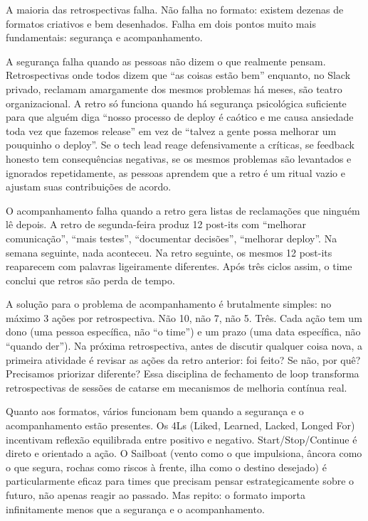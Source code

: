 A maioria das retrospectivas falha. Não falha no formato: existem dezenas
de formatos criativos e bem desenhados. Falha em dois pontos muito mais
fundamentais: segurança e acompanhamento.

A segurança falha quando as pessoas não dizem o que realmente pensam.
Retrospectivas onde todos dizem que ``as coisas estão bem'' enquanto, no
Slack privado, reclamam amargamente dos mesmos problemas há meses, são
teatro organizacional. A retro só funciona quando há segurança psicológica
suficiente para que alguém diga ``nosso processo de deploy é caótico e me
causa ansiedade toda vez que fazemos release'' em vez de ``talvez a gente
possa melhorar um pouquinho o deploy''. Se o tech lead reage
defensivamente a críticas, se feedback honesto tem consequências negativas,
se os mesmos problemas são levantados e ignorados repetidamente, as pessoas
aprendem que a retro é um ritual vazio e ajustam suas contribuições de acordo.

O acompanhamento falha quando a retro gera listas de reclamações que ninguém
lê depois. A retro de segunda-feira produz 12 post-its com ``melhorar
comunicação'', ``mais testes'', ``documentar decisões'', ``melhorar deploy''.
Na semana seguinte, nada aconteceu. Na retro seguinte, os mesmos 12 post-its
reaparecem com palavras ligeiramente diferentes. Após três ciclos assim, o
time conclui que retros são perda de tempo.

A solução para o problema de acompanhamento é brutalmente simples: no
máximo 3 ações por retrospectiva. Não 10, não 7, não 5. Três. Cada ação
tem um dono (uma pessoa específica, não ``o time'') e um prazo (uma data
específica, não ``quando der''). Na próxima retrospectiva, antes de
discutir qualquer coisa nova, a primeira atividade é revisar as ações da
retro anterior: foi feito? Se não, por quê? Precisamos priorizar
diferente? Essa disciplina de fechamento de loop transforma retrospectivas
de sessões de catarse em mecanismos de melhoria contínua real.

Quanto aos formatos, vários funcionam bem quando a segurança e o
acompanhamento estão presentes. Os 4Ls (Liked, Learned, Lacked, Longed
For) incentivam reflexão equilibrada entre positivo e negativo.
Start/Stop/Continue é direto e orientado a ação. O Sailboat (vento como
o que impulsiona, âncora como o que segura, rochas como riscos à frente,
ilha como o destino desejado) é particularmente eficaz para times que
precisam pensar estrategicamente sobre o futuro, não apenas reagir ao
passado. Mas repito: o formato importa infinitamente menos que a segurança
e o acompanhamento.

